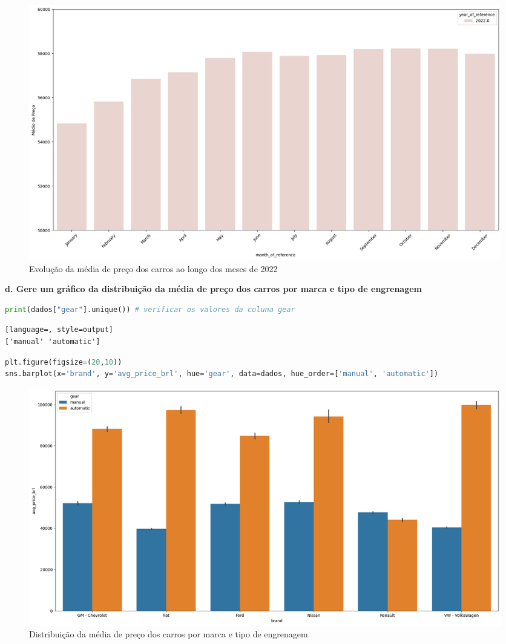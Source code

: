 \begin{figure}[H]
\centering
\includegraphics[width=1\linewidth]{apendices/fig/2_IAA002_3.png}
\caption{Evolução da média de preço dos carros ao longo dos meses de 2022}
\end{figure}



\begin{adjustwidth}{1em}{}
\textbf{d. Gere um gráfico da distribuição da média de preço dos carros por marca e tipo de engrenagem}
\end{adjustwidth}
\begin{lstlisting}[language=Python, style=input]
print(dados["gear"].unique()) # verificar os valores da coluna gear
\end{lstlisting}
\begin{lstlisting}[language=, style=output]
['manual' 'automatic']
\end{lstlisting}
\begin{lstlisting}[language=Python, style=input]
plt.figure(figsize=(20,10))
sns.barplot(x='brand', y='avg_price_brl', hue='gear', data=dados, hue_order=['manual', 'automatic'])
\end{lstlisting}
\begin{figure}[H]
\centering
\includegraphics[width=1\linewidth]{apendices/fig/2_IAA002_4.png}
\caption{Distribuição da média de preço dos carros por marca e tipo de engrenagem}
\end{figure}

